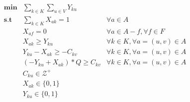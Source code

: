 \begin{align*}
    \mathbf{min} &\sum_{k\in K} \sum_{u \in V} {Y_{ku}} \\
   \mathbf{s.t}  &\sum_{k \in K}{X_{ak}=1} & \forall a \in A\\
        &X_{af} = 0 & \forall a \in A - f,  \forall f \in F\\
        &X_{ak} \geq Y_{ku} & \forall k \in K, \forall a = (u,v) \in A \\
        &Y_{ku} - X_{ak} \geq -C_{kv} & \forall k \in K, \forall a = (u,v) \in A \\
        &(-Y_{ku} + X_{ak}) * Q \geq C_{kv} & \forall k \in K, \forall a = (u,v) \in A \\
        &C_{ku} \in \mathcal{Z^+} \\
        &X_{ak} \in \{0,1\} \\
        &Y_{ku} \in \{0,1\}
\end{align*}